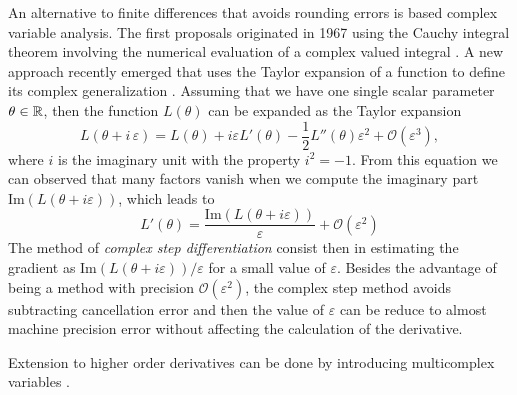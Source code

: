 An alternative to finite differences that avoids rounding errors is based complex variable analysis. 
The first proposals originated in 1967 using the Cauchy integral theorem involving the numerical evaluation of a complex valued integral \cite{Lyness_1967, Lyness_Moler_1967} .
A new approach recently emerged that uses the Taylor expansion of a function to define its complex generalization \cite{Squire_Trapp_1998_complex_diff, Martins_Sturdza_Alonso_2003_complex_differentiation}. 
Assuming that we have one single scalar parameter $\theta \in \operatorname{\mathbb{R}}$, then the function $L(\theta)$ can be expanded as 
the Taylor expansion
\begin{equation}
    L(\theta + i \, \varepsilon)
    = 
    L(\theta) + i \varepsilon L'(\theta) 
    - 
    \frac 1 2
    L''(\theta) \varepsilon^2
    + 
    \mathcal O (\varepsilon^3),
\end{equation}
where $i$ is the imaginary unit with the property $i^2 = -1$. 
From this equation we can observed that many factors vanish when we compute the imaginary part $\text{Im}(L(\theta + i \varepsilon))$, which leads to
\begin{equation}
    L'(\theta) 
    = 
    \frac{\text{Im}(L(\theta + i \varepsilon))}{\varepsilon}
    + 
    \mathcal{O} (\varepsilon^2)
\end{equation}
The method of \textit{complex step differentiation} consist then in estimating the gradient as $\text{Im}(L(\theta + i \varepsilon)) / \varepsilon$ for a small value of $\varepsilon$. 
Besides the advantage of being a method with precision $\mathcal{O}(\varepsilon^2)$, the complex step method avoids subtracting cancellation error and then the value of $\varepsilon$ can be reduce to almost machine precision error without affecting the calculation of the derivative. 

Extension to higher order derivatives can be done by introducing multicomplex variables \cite{Lantoine_Russell_Dargent_2012}. 